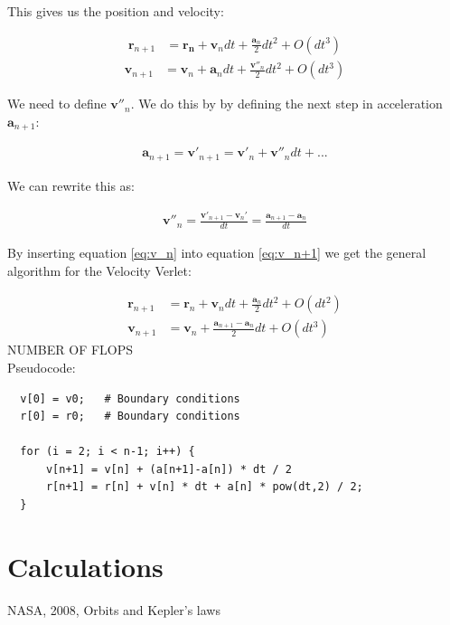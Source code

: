 \documentclass{article}
\begin{document}
This gives us the position and velocity:

\begin{align}
    \mathbf{r}_{n+1}&=\mathbf{r_n}+\mathbf{v}_n dt + \frac{\mathbf{a}_n}{2}dt^2+O(dt^3)
    \label{eq:r_n+1}
    \end{align}
    \begin{align}
    \mathbf{v}_{n+1}&=\mathbf{v}_n+\mathbf{a}_ndt+\frac{\mathbf{v}''_n}{2}dt^2 + O(dt^3)
     \label{eq:v_n+1}
\end{align}

We need to define $\mathbf{v}''_n$. We do this by by defining the next step in acceleration $\mathbf{a}_{n+1}$:

\begin{align*}
    \mathbf{a}_{n+1}=\mathbf{v}'_{n+1}=\mathbf{v}'_n+\mathbf{v}''_ndt + ...
\end{align*}

We can rewrite this as:

\begin{align}
        \mathbf{v}''_n=\frac{\mathbf{v}'_{n+1}-\mathbf{v}_n'}{dt}
    =\frac{\mathbf{a}_{n+1}-\mathbf{a}_n}{dt}
    \label{eq:v_n}
\end{align}

By inserting equation \ref{eq:v_n} into equation \ref{eq:v_n+1} we get the general algorithm for the Velocity Verlet:

\begin{align*}
    \mathbf{r}_{n+1}&=\mathbf{r}_n+\mathbf{v}_ndt+\frac{\mathbf{a}_n}{2}dt^2+O(dt^2)\\
    \mathbf{v}_{n+1}&=\mathbf{v}_n+\frac{\mathbf{a}_{n+1}-\mathbf{a}_n}{2}dt+O(dt^3)
\end{align*}
NUMBER OF FLOPS
\\
Pseudocode:

\begin{verbatim}
  v[0] = v0;   # Boundary conditions
  r[0] = r0;   # Boundary conditions

  for (i = 2; i < n-1; i++) {
      v[n+1] = v[n] + (a[n+1]-a[n]) * dt / 2
      r[n+1] = r[n] + v[n] * dt + a[n] * pow(dt,2) / 2;
  }

\end{verbatim}

\section{Calculations} 

\begin{thebibliography}{9}
	NASA, 2008, Orbits and Kepler's laws
\end{thebibliography}
\end{document}
